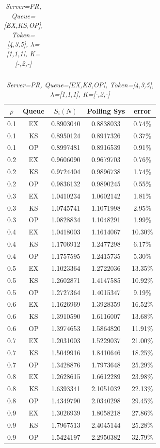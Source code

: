 \documentclass[12pt,a4paper,italian]{article}
\begin{document}
\begin{table}[ht!]
\begin{minipage}[b]{0.48\linewidth}
\begin{tabular}{c c c c c}
		\end{tabular}
	\end{minipage}
	\hspace{0.5cm}
	\begin{minipage}[b]{0.48\linewidth}
		\centering
		\caption{\scriptsize \emph{Server=PR, Queue=[EX,KS,OP], Token=[4,3,5], $\lambda$=[1,1,1], K=[-,2,-]}}
		\label{tab12}
		\tiny
		\begin{tabular}{c c c c c}
			\hline
			$\rho$ & Queue & $S_i(N)$ & Polling Sys & error \\ \hline
		 0.1 & EX & 0.8903040 &   0.8838033    & 0.74\%  \\
		 0.1 & KS & 0.8950124 &   0.8917326    & 0.37\%  \\
		 0.1 & OP & 0.8997481 &   0.8916539    & 0.91\%  \\ \hline \hline
		 0.2 & EX & 0.9606090 &   0.9679703    & 0.76\%  \\
		 0.2 & KS & 0.9724404 &   0.9896738    & 1.74\%  \\
		 0.2 & OP & 0.9836132 &   0.9890245    & 0.55\%  \\ \hline \hline
		 0.3 & EX & 1.0410234 &   1.0602142    & 1.81\%  \\
		 0.3 & KS & 1.0745741 &   1.1071998    & 2.95\%  \\
		 0.3 & OP & 1.0828834 &   1.1048291    & 1.99\%  \\ \hline \hline
		 0.4 & EX & 1.0418003 &   1.1614067    & 10.30\% \\
		 0.4 & KS & 1.1706912 &   1.2477298    & 6.17\%  \\
		 0.4 & OP & 1.1757595 &   1.2415735    & 5.30\%  \\ \hline \hline
		 0.5 & EX & 1.1023364 &   1.2722036    & 13.35\% \\
		 0.5 & KS & 1.2602871 &   1.4147585    & 10.92\% \\
		 0.5 & OP & 1.2727364 &   1.4015347    & 9.19\%  \\ \hline \hline
		 0.6 & EX & 1.1626969 &   1.3928359    & 16.52\% \\
		 0.6 & KS & 1.3910590 &   1.6116007    & 13.68\% \\
		 0.6 & OP & 1.3974653 &   1.5864820    & 11.91\% \\ \hline \hline
		 0.7 & EX & 1.2031003 &   1.5229037    & 21.00\% \\
		 0.7 & KS & 1.5049916 &   1.8410646    & 18.25\% \\
		 0.7 & OP & 1.3428876 &   1.7973648    & 25.29\% \\ \hline \hline
		 0.8 & EX & 1.2628615 &   1.6612289    & 23.98\% \\
		 0.8 & KS & 1.6393341 &   2.1051032    & 22.13\% \\
		 0.8 & OP & 1.4349790 &   2.0340298    & 29.45\% \\ \hline \hline
		 0.9 & EX & 1.3026939 &   1.8058218    & 27.86\% \\
		 0.9 & KS & 1.7967513 &   2.4045144    & 25.28\% \\
		 0.9 & OP & 1.5424197 &   2.2950382    & 32.79\% \\\hline
		 

\end{tabular}
\end{minipage}
\end{table}
\end{document}
